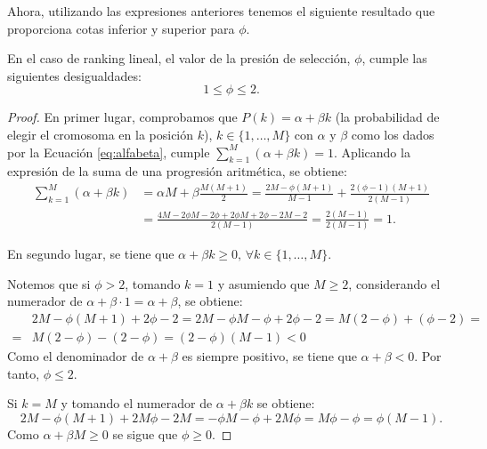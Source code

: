 Ahora, utilizando las expresiones anteriores tenemos el siguiente resultado que proporciona cotas inferior y superior para $\phi$.
\begin{proposition}
    En el caso de ranking lineal, el valor de la presión de selección, $\phi$, cumple las siguientes desigualdades:
    $$1\leq\phi\leq2.$$
    \begin{proof}
        En primer lugar, comprobamos que $P(k)=\alpha+\beta k$ (la probabilidad de elegir el cromosoma en la posición $k$), $k\in\{1,\ldots,M\}$ con $\alpha$ y $\beta$ como los dados por la Ecuación \ref{eq:alfabeta}, cumple $\sum_{k=1}^M(\alpha+\beta k)=1$. Aplicando la expresión de la suma de una progresión aritmética, se obtiene:        
        \begin{equation*}
            \begin{split}
                \sum_{k=1}^M(\alpha+\beta k)&=\alpha M+\beta\frac{M(M+1)}{2}=\frac{2M-\phi(M+1)}{M-1}+\frac{2(\phi-1)(M+1)}{2(M-1)}\\
                &=\frac{4M-2\phi M-2\phi+2\phi M+2\phi-2M-2}{2(M-1)}=\frac{2(M-1)}{2(M-1)}=1.
            \end{split}
        \end{equation*}

        En segundo lugar, se tiene que $\alpha+\beta k \geq 0,\,\forall k\in\{1,\ldots,M\}$.
        
        \noindent\textbullet\hspace{0.4cm}Notemos que si $\phi>2$, tomando $k=1$ y asumiendo que $M\geq2$, considerando el numerador de $\alpha+\beta\cdot 1=\alpha+\beta$, se obtiene:
        \begin{equation*}
            \begin{split}
                &2M-\phi(M+1)+2\phi -2=2M-\phi M-\phi+2\phi-2=M(2-\phi)+( \phi-2)=\\
                =&M(2-\phi)-(2-\phi)=(2-\phi)(M-1)<0
            \end{split}            
        \end{equation*}
        Como el denominador de $\alpha+\beta$ es siempre positivo, se tiene que $\alpha+\beta<0$. Por tanto, $\phi\leq2$.
         
        \noindent\textbullet\hspace{0.4cm} Si $k=M$ y tomando el numerador de $\alpha+\beta k$ se obtiene:
        $$2M-\phi(M+1)+2M\phi-2M=-\phi M-\phi+2M\phi=M\phi-\phi=\phi(M-1).$$
        Como $\alpha+\beta M\geq0$ se sigue que $\phi\geq0$.


\end{proof}
\end{proposition}
